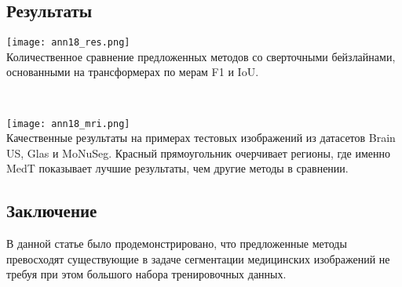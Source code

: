 \subsection*{Результаты}
\begin{minipage}{1.0\linewidth}
    \begin{center}
        \texttt{[image: ann18\_res.png]} \\
        \caption{\scriptsize{
           Количественное сравнение предложенных методов со сверточными бейзлайнами, основанными на трансформерах
           по мерам F1 и IoU.
        }}
    \end{center}
    
\end{minipage} \\

\begin{minipage}{1.0\linewidth}
    \begin{center}
        \texttt{[image: ann18\_mri.png]} \\
        \caption{\scriptsize{
            Качественные результаты на примерах тестовых изображений из датасетов Brain US, Glas и MoNuSeg.
            Красный прямоугольник очерчивает регионы, где именно MedT показывает лучшие результаты, чем 
            другие методы в сравнении.
        }}
    \end{center}
    
\end{minipage}

\subsection*{Заключение}
В данной статье было продемонстрировано, что предложенные методы превосходят существующие 
в задаче сегментации медицинских изображений не требуя при этом большого набора тренировочных данных.

